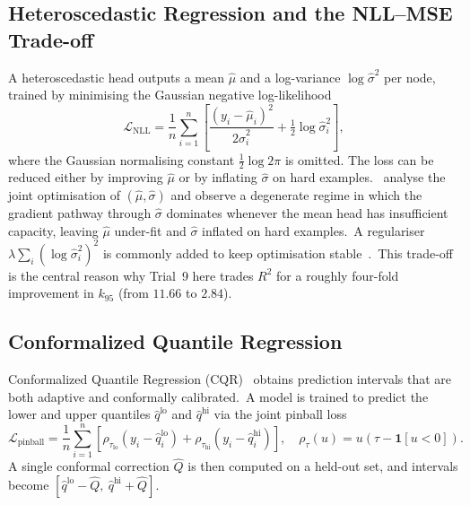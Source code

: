 \subsection{Heteroscedastic Regression and the NLL--MSE Trade-off}\label{sec:hetero_bg}

A heteroscedastic head outputs a mean $\hat\mu$ and a log-variance $\log\hat\sigma^2$ per node, trained by minimising the Gaussian negative log-likelihood
\begin{equation}\label{eq:hetero_nll_bg}
 \mathcal{L}_\text{NLL} = \frac{1}{n}\sum_{i=1}^{n} \left[\frac{(y_i - \hat\mu_i)^2}{2\hat\sigma_i^2} + \tfrac{1}{2}\log\hat\sigma_i^2\right]\!,
\end{equation}
where the Gaussian normalising constant $\tfrac{1}{2}\log 2\pi$ is omitted.
The loss can be reduced either by improving $\hat\mu$ or by inflating $\hat\sigma$ on hard examples.\ \textcite{seitzer2022pitfalls} analyse the joint optimisation of $(\hat\mu,\hat\sigma)$ and observe a degenerate regime in which the gradient pathway through $\hat\sigma$ dominates whenever the mean head has insufficient capacity, leaving $\hat\mu$ under-fit and $\hat\sigma$ inflated on hard examples.\ A regulariser $\lambda \sum_i (\log\hat\sigma_i^2)^2$ is commonly added to keep optimisation stable~\cite{seitzer2022pitfalls}.\ This trade-off is the central reason why Trial~9 here trades $R^2$ for a roughly four-fold improvement in $k_{95}$ (from $11.66$ to $2.84$).

\subsection{Conformalized Quantile Regression}\label{sec:cqr_bg}

Conformalized Quantile Regression (CQR)~\cite{romano2019conformalized} obtains prediction intervals that are both adaptive and conformally calibrated.\ A model is trained to predict the lower and upper quantiles $\hat q^\text{lo}$ and $\hat q^\text{hi}$ via the joint pinball loss
\begin{equation}\label{eq:pinball_bg}
 \mathcal{L}_\text{pinball} = \frac{1}{n}\sum_{i=1}^{n} \left[\rho_{\tau_\text{lo}}(y_i - \hat q_i^\text{lo}) + \rho_{\tau_\text{hi}}(y_i - \hat q_i^\text{hi})\right],
 \quad \rho_\tau(u) = u(\tau - \mathbf{1}[u<0]).
\end{equation}
A single conformal correction $\hat Q$ is then computed on a held-out set, and intervals become $[\hat q^\text{lo} - \hat Q,\ \hat q^\text{hi} + \hat Q]$.

